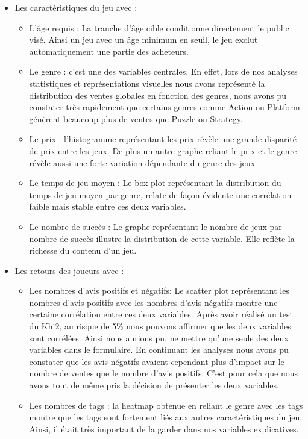 \documentclass[mstat,12pt]{unswthesis}
\begin{document}
\begin{itemize}
\item Les caractéristiques du jeu avec : 
\begin{itemize}
\item L’âge requis : La tranche d’âge cible conditionne directement le public visé. Ainsi un jeu avec un âge minimum en seuil, le jeu exclut automatiquement une partie des acheteurs.
\item Le genre : c’est une des variables centrales. En effet, lors de nos analyses statistiques et représentations visuelles nous  avons représenté la distribution des ventes globales en fonction des genres, nous avons pu constater très rapidement que certains genres comme Action ou Platform génèrent beaucoup plus de ventes que Puzzle ou Strategy. 
\item Le prix : l’histogramme représentant les prix révèle une grande disparité de prix entre les jeux. De plus un autre graphe reliant le prix et le genre révèle aussi une forte variation dépendante du genre des jeux 
\item Le temps de jeu moyen : Le  box-plot représentant la distribution du temps de jeu moyen par genre, relate de façon évidente une corrélation faible mais stable  entre ces deux variables.
\item Le nombre de succès : Le graphe représentant le nombre de jeux par nombre de succès illustre la distribution de cette variable. Elle reflète la richesse du contenu d’un jeu.  
\end{itemize}

\item Les retours des joueurs avec :
\begin{itemize}
\item Les nombres d’avis positifs et négatifs: Le scatter plot représentant les nombres d’avis positifs avec les nombres d’avis négatifs montre une certaine corrélation entre ces deux variables. Après avoir réalisé un test du Khi2, au risque de 5\% nous pouvons affirmer que les deux variables sont corrélées. Ainsi nous aurions pu, ne mettre qu’une seule des deux variables dans le formulaire. En continuant les analyses nous avons pu constater que les avis négatifs avaient cependant plus d’impact sur le nombre de ventes que le nombre d’avis positifs. C’est pour cela que nous avons tout de même pris la décision de présenter les deux variables.
\item Les nombres de tags : la heatmap obtenue en reliant le genre avec les tags montre que les tags sont fortement liés aux autres caractéristiques du jeu. Ainsi, il était très important de la garder dans nos variables explicatives.
\end{itemize}


\end{itemize}
\end{document}
